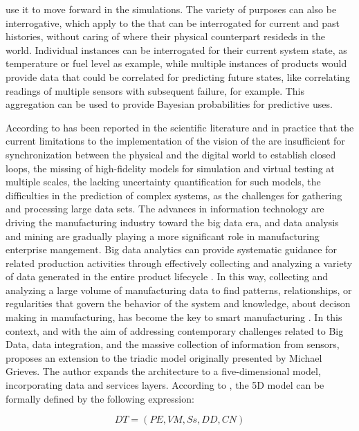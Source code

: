\begin{itemize}
    use it to move forward in the simulations. The variety of purposes can also be interrogative, which apply to the \DTIs that can be 
    interrogated for current and past histories, without caring of where their physical counterpart resideds in the world. Individual 
    instances can be interrogated for their current system state, as temperature or fuel level as example, while multiple instances 
    of products would provide data that could be correlated for predicting future states, like correlating readings of multiple 
    sensors with subsequent failure, for example. This aggregation can be used to provide Bayesian probabilities for predictive uses.
\end{itemize}

According to  has been reported in the scientific literature and in practice that the current limitations to the 
implementation of the vision of the \DTs are insufficient for synchronization between the physical and the digital world to establish 
closed loops, the missing of high-fidelity models for simulation and virtual testing at multiple scales, the lacking uncertainty 
quantification for such models, the difficulties in the prediction of complex systems, as the challenges for gathering and processing 
large data sets. The advances in information technology are driving the manufacturing industry toward the big data era, and 
data analysis and mining are gradually playing a more significant role in manufacturing enterprise mangement. Big data analytics 
can provide systematic guidance for related production activities through effectively collecting and analyzing a variety of data 
generated in the entire product lifecycle \cite{Tao2017PLM}. In this way, collecting and analyzing a large volume of manufacturing 
data to find patterns, relationships, or regularities that govern the behavior of the system and knowledge, about decison making in 
manufacturing, has become the key to smart manufacturing \cite{Qi2018}. In this context, and with the aim of addressing contemporary 
challenges related to Big Data, data integration, and the massive collection of information from sensors,  proposes 
an extension to the triadic model originally presented by Michael Grieves. The author expands the architecture to a five-dimensional 
model, incorporating data and services layers. According to , the 5D model can be formally defined by the following 
expression:

\[DT = (PE, VM, Ss, DD, CN)\]

